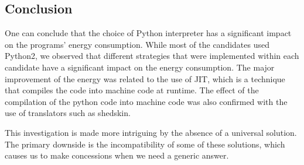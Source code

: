 \subsection{Conclusion}
One can conclude that the choice of Python interpreter has a significant impact on the programs' energy consumption.
While most of the candidates used Python2, we observed that different strategies that were implemented within each candidate have a significant impact on the energy consumption. 
The major improvement of the energy was related to the use of JIT, which is a technique that compiles the code into machine code at runtime. 
The effect of the compilation of the python code into machine code was also confirmed with the use of translators such as shedskin. 

This investigation is made more intriguing by the absence of a universal solution.
The primary downside is the incompatibility of some of these solutions, which causes us to make concessions when we need a generic answer.
